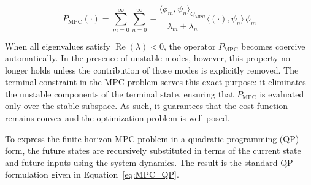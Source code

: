 \begin{equation} \label{eq:P_MPC}
P_{\mathrm{MPC}} (\cdot) = \sum_{m=0}^\infty \sum_{n=0}^\infty 
    -\frac{
        \langle \phi_m , \psi_n \rangle_{Q_{\mathrm{MPC}}}
    }{
        \lambda_m + \overline{\lambda_n}
    }
    \langle (\cdot) , \psi_n \rangle \, \phi_m
\end{equation}

When all eigenvalues satisfy $\operatorname{Re}(\lambda) < 0$, the operator $P_{\mathrm{MPC}}$ becomes coercive automatically. In the presence of unstable modes, however, this property no longer holds unless the contribution of those modes is explicitly removed. The terminal constraint in the MPC problem serves this exact purpose: it eliminates the unstable components of the terminal state, ensuring that $P_{\mathrm{MPC}}$ is evaluated only over the stable subspace. As such, it guarantees that the cost function remains convex and the optimization problem is well-posed\autocite{Curtain2020Introduction, xu2017linear}.

To express the finite-horizon MPC problem in a quadratic programming (QP) form, the future states are recursively substituted in terms of the current state and future inputs using the system dynamics. The result is the standard QP formulation given in Equation~\ref{eq:MPC_QP}.

